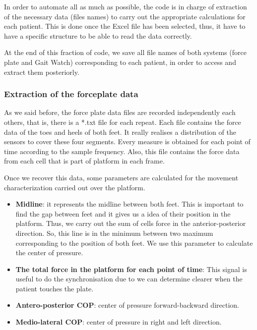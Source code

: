 In order to automate all as much as possible, the code is in charge of extraction of the necessary data (files names) to carry out the appropriate calculations for each patient. This is done once the Excel file has been selected, thus, it have to have a specific structure to be able to read the data correctly.

At the end of this fraction of code, we save all file names of both systems (force plate and Gait Watch) corresponding to each patient, in order to access and extract them posteriorly.

\subsubsection{Extraction of the forceplate data}
As we said before, the  force plate data files are recorded independently each others, that is, there is a *.txt file for each repeat.
Each file contains the force data of the toes and heels of both feet. It really realises a distribution of the sensors to cover these four segments. Every measure is obtained for each point of time according to the sample frequency. Also, this file contains the force data from each cell that is part of platform in each frame.

Once we recover this data, some parameters are calculated for the movement characterization carried out over the platform. 

\begin{itemize}
	\item \textbf{Midline}: it represents the midline between both feet. This is important to find the gap between feet and it gives us a idea of their position in the platform. Thus, we carry out the sum of cells force in the anterior-posterior direction. So, this line is in the minimum between two maximum corresponding to the position of both feet. We use this parameter to calculate the center of pressure.
	
	\item \textbf{The total force in the platform for each point of time}: This signal is useful to do the synchronisation due to we can determine clearer when the patient touches the plate.
	
	\item \textbf{Antero-posterior COP}: center of pressure forward-backward direction.
	
	\item \textbf{Medio-lateral  COP}: center of pressure  in right and left direction.
	
	
\end{itemize}

